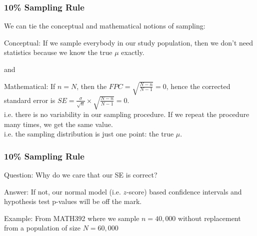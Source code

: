 \documentclass[handout]{beamer}
\newcommand{\blue}[1]{\textcolor{blue2}{#1}}
\begin{document}
\begin{frame}[fragile]
\frametitle{10\% Sampling Rule}
We can tie the \blue{conceptual} and \blue{mathematical} notions of sampling:  

\vspace{0.25cm}
\pause
\blue{Conceptual}:  If we sample everybody in our study population, then we don't need statistics because we know the true $\mu$ exactly.
\begin{center}
\pause and
\end{center}
\blue{Mathematical}:  If $n=N$, then the $FPC = \sqrt{\frac{N-n}{N-1}} = 0$, hence the \blue{corrected} standard error is $SE = \frac{\sigma}{\sqrt{n}}\times\sqrt{\frac{N-n}{N-1}} = 0$.\\
\vspace{0.25cm}
\pause
i.e. there is no variability in our sampling procedure.  If we repeat the procedure many times, we get the same value.\\
\vspace{0.25cm}
\pause
i.e. the sampling distribution is just one point: the true $\mu$.\\

\end{frame}


\begin{frame}[fragile]
\frametitle{10\% Sampling Rule}
\blue{Question}:  Why do we care that our SE is correct?

\pause\vspace{0.5cm}

\blue{Answer}:  If not, our normal model (i.e. $z$-score) based confidence intervals and hypothesis test p-values will be off the mark.

\pause\vspace{0.5cm}
\blue{Example}:  From MATH392 where we sample $n=40,000$ without replacement from a population of size $N=60,000$
\end{frame}
\end{document}
